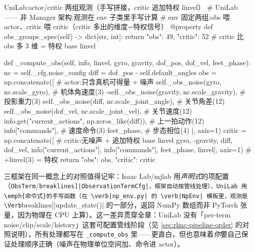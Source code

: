\begin{codebox}[Python]{UniLab:actor/critic 两组观测（手写拼接，critic 追加特权 linvel）}
# UniLab —— 非 Manager 架构:观测在 env 子类里手写计算
# env 固定两组:obs 喂 actor、critic 喂 critic（critic 多出的维度=特权信号）
@property
def obs_groups_spec(self) -> dict[str, int]:
    return {"obs": 49, "critic": 52}        # critic 比 obs 多 3 维 = 特权 base linvel

def _compute_obs(self, info, linvel, gyro, gravity, dof_pos, dof_vel, feet_phase):
    nc = self._cfg.noise_config
    diff = dof_pos - self.default_angles
    obs = np.concatenate([                   # actor:只含真机可得量 + 噪声
        self._obs_noise(gyro, nc.scale_gyro),          # 机体角速度(3)
        -self._obs_noise(gravity, nc.scale_gravity),   # 投影重力(3)
        self._obs_noise(diff, nc.scale_joint_angle),   # 关节角差(12)
        self._obs_noise(dof_vel, nc.scale_joint_vel),  # 关节速度(12)
        info.get("current_actions", np.zeros_like(diff)),  # 上一拍动作(12)
        info["commands"],                              # 速度命令(3)
        feet_phase,                                    # 步态相位(4)
    ], axis=1)
    critic = np.concatenate([                # critic:无噪声 + 追加特权 base linvel
        gyro, -gravity, diff, dof_vel, info["current_actions"],
        info["commands"], feet_phase, linvel], axis=1)   # +linvel(3) = 特权
    return {"obs": obs, "critic": critic}
\end{codebox}

三框架在同一概念上的对照值得记牢：Isaac Lab/mjlab 用\emph{声明式}的项配置（\verb|ObsTerm|/\allowbreak\Verb[breaklines]|ObservationTermCfg|，框架自动按管线处理），UniLab 用\emph{命令式}的手写函数（在 \verb|np_env.py| 的 \verb|NpEnv| 模板里，观测是 \Verb[breaklines]|update_state()| 的一部分，返回 NumPy 数组而非 PyTorch 张量，因为物理在 CPU 上算）。这一差异贯穿全章：UniLab 没有「per-term noise/clip/scale/history」这套可配置管线阶段（见 \cref{sec:rlmc-pipeline-order} 的对照说明），所有处理都写在 \verb|_compute_obs| 里——更直白，但也意味着\emph{你}要自己保证处理顺序正确（噪声在物理单位空间加、命令进 actor）。

